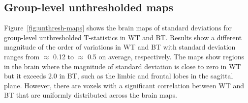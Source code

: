 \documentclass[conference]{IEEEtran}
\begin{document}
  \begin{figure}[b]
  \end{figure}



\subsection{Group-level unthresholded maps}

Figure~\ref{fig:unthresh-maps} shows the brain maps of standard deviations for group-level unthresholded T-statistics in WT and BT.
Results show a different magnitude of
the order of variations in WT and BT with standard deviation ranges from $\approx$ 0.12 to $\approx$ 0.5 on average, respectively.
The maps show regions in the brain where the magnitude of standard deviation is close to zero in WT but it exceeds 2.0 in BT,
such as the limbic and frontal lobes in the sagittal plane.
However, there are voxels with a significant correlation between WT and BT that are uniformly distributed across the brain maps.
\end{document}
